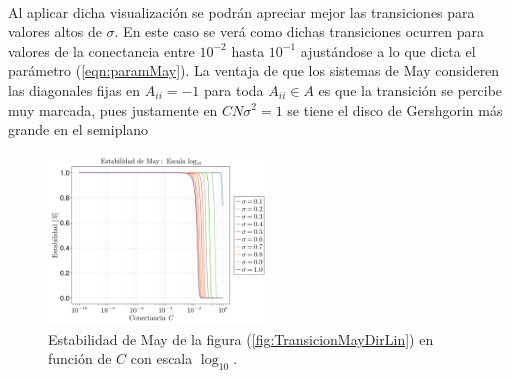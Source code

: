 \\
Al aplicar dicha visualización se podrán apreciar mejor las transiciones para valores altos de $\sigma$. En este caso se verá como dichas transiciones ocurren para valores de la conectancia entre $10^{-2}$ hasta $10^{-1}$ ajustándose a lo que dicta el parámetro (\ref{eqn:paramMay}). La ventaja de que los sistemas de May consideren las diagonales fijas en $A_{ii}=-1$ para toda $A_{ii}\in A$ es que la transición se percibe muy marcada, pues justamente en $CN\sigma^2=1$ se tiene el disco de Gershgorin más grande en el semiplano
\begin{figure} \vspace{-30pt} \begin{center}
		\includegraphics[width=0.52\textwidth]{../Imagenes/TransicionMayDirLog} 
	\end{center} 
	\vspace{-20pt} 
	\caption{Estabilidad de May de la figura (\ref{fig:TransicionMayDirLin}) en función de $C$ con escala $\log_{10}$.} 
	\vspace{-10pt}
	\label{fig:TransicionMayDirLog}
\end{figure} 

